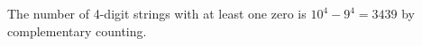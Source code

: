 The number of 4-digit strings with at least one zero is $10^{4} - 9^{4} = 3439$ by complementary counting.